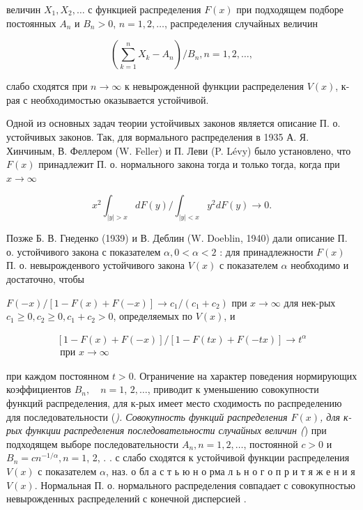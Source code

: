 \documentclass[10pt]{article}
\begin{document}
величин $X_{1}, X_{2}, \ldots$ с функцией распределения $F(x)$ при подходящем подборе постоянных $A_{n}$ и $B_{n}>0$, $n=1,2, \ldots$, распределения случайных величин



\[

\left(\sum_{k=1}^{n} X_{k}-A_{n}\right) / B_{n}, n=1,2, \ldots,

\]



слабо сходятся при $n \rightarrow \infty$ к невырожденной функции распределения $V(x)$, к-рая с необходимостью оказывается устойчивой.



Одной из основных задач теории устойчивых законов является описание П. о. устойчивых законов. Так, для вормального распределения в 1935 А. Я. Хинчиным, В. Феллером (W. Feller) и П. Леви (P. Lévy) было установлено, что $F(x)$ принадлежит П. о. нормального закона тогда и только тогда, когда при $x \rightarrow \infty$



\[

x^{2} \int_{|y|>x} d F(y) / \int_{|y|<x} y^{2} d F(y) \longrightarrow 0 .

\]



Позже Б. В. Гнеденко (1939) и В. Деблин (W. Doeblin, 1940) дали описание П. о. устойчивого закона с показателем $\alpha, 0<\alpha<2$ : для принадлежности $F(x)$ П. о. невырожденвого устойчивого закона $V(x)$ с показателем $\alpha$ необходимо и достаточно, чтобы



$F(-x) /[1-F(x)+F(-x)] \longrightarrow c_{1} /\left(c_{1}+c_{2}\right)$ при $x \longrightarrow \infty$ для нек-рых $c_{1} \geqslant 0, c_{2} \geqslant 0, c_{1}+c_{2}>0$, определяемых по $V(x)$, и



\[

\begin{gathered}

{[1-F(x)+F(-x)] /[1-F(t x)+F(-t x)] \longrightarrow t^{\alpha}} \\

\text { при } x \longrightarrow \infty

\end{gathered}

\]



при каждом постоянном $t>0$. Ограничение на характер поведения нормирующих коэффициентов $B_{n}, \quad n=1$, $2, \ldots$, приводит к уменьшению совокупности функций распределения, для к-рых имеет место сходимость по распределению для последовательности (\textit{). Совокупность функций распределения $F(x)$, для к-рых функции распределения последовательности случайных величин (}) при подходящем выборе последовательности $A_{n}, n=1,2, \ldots$, постоянной $c>0$ и $B_{n}=c n^{-1 / \alpha}, n=1$, 2, . . с слабо сходятся к устойчивой функции распределения $V(x)$ с показателем $\alpha$, наз. о бл а с т ь ю н о рма л ь н о г о п р и т я ж е н и я $V(x)$. Нормальная П. о. нормального распределения совпадает с совокупностью невырожденных распределений с конечной дисперсией .
\end{document}
